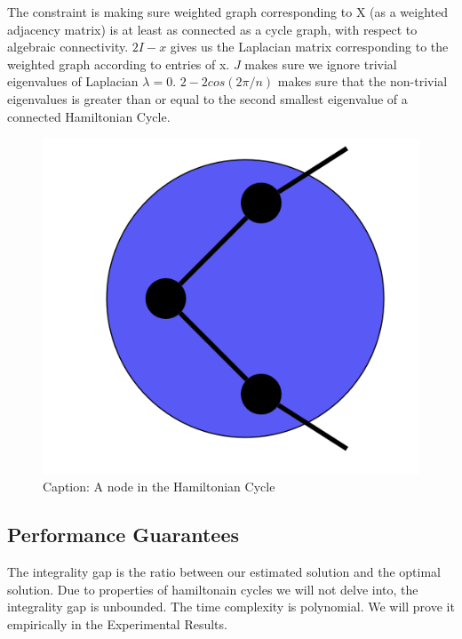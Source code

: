\documentclass{article}
\begin{document}
The constraint is making sure weighted graph corresponding to X (as a weighted adjacency matrix) is at least as connected as a cycle graph, with respect to algebraic connectivity. $2I-x$ gives us the Laplacian matrix corresponding to the weighted graph according to entries of x. $J$ makes sure we ignore trivial eigenvalues of Laplacian $\lambda = 0$. $2-2cos(2\pi/n)$ makes sure that the non-trivial eigenvalues is greater than or equal to the second smallest eigenvalue of a connected Hamiltonian Cycle.
\begin{figure}[!ht]
    \centering
    \includegraphics{assets/degrees.png}
    \caption{Caption: A node in the Hamiltonian Cycle}
    \label{fig:degrees}
\end{figure}
\subsection{Performance Guarantees}
The integrality gap is the ratio between our estimated solution and the optimal solution. 
Due to properties of hamiltonain cycles we will not delve into, the integrality gap is unbounded.
The time complexity is polynomial. We will prove it empirically in the Experimental Results.

\end{document}
